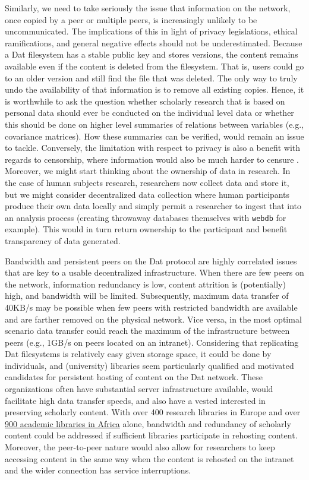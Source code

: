 \documentclass[publications,article,submit,moreauthors,pdftex,10pt,a4paper]{Definitions/mdpi}
\begin{document}
Similarly, we need to take seriously the issue that information on the
network, once copied by a peer or multiple peers, is increasingly
unlikely to be uncommunicated. The implications of this in light of
privacy legislations, ethical ramifications, and general negative
effects should not be underestimated. Because a Dat filesystem has a
stable public key and stores versions, the content remains available
even if the content is deleted from the filesystem. That is, users could
go to an older version and still find the file that was deleted. The
only way to truly undo the availability of that information is to remove
all existing copies. Hence, it is worthwhile to ask the question whether
scholarly research that is based on personal data should ever be
conducted on the individual level data or whether this should be done on
higher level summaries of relations between variables (e.g., covariance
matrices). How these summaries can be verified, would remain an issue to
tackle. Conversely, the limitation with respect to privacy is also a
benefit with regards to censorship, where information would also be much
harder to censure \citep[in stark contrast to publishers that might be
pressured by governments;][]{guardian-cup}. Moreover, we might start
thinking about the ownership of data in research. In the case of human
subjects research, researchers now collect data and store it, but we
might consider decentralized data collection where human participants
produce their own data locally and simply permit a researcher to ingest
that into an analysis process (creating throwaway databases themselves
with \texttt{webdb} for example). This would in turn return ownership to
the participant and benefit transparency of data generated.

Bandwidth and persistent peers on the Dat protocol are highly correlated
issues that are key to a usable decentralized infrastructure. When there
are few peers on the network, information redundancy is low, content
attrition is (potentially) high, and bandwidth will be limited.
Subsequently, maximum data transfer of 40KB/s may be possible when few
peers with restricted bandwidth are available and are farther removed on
the physical network. Vice versa, in the most optimal scenario data
transfer could reach the maximum of the infrastructure between peers
(e.g., 1GB/s on peers located on an intranet). Considering that
replicating Dat filesystems is relatively easy given storage space, it
could be done by individuals, and (university) libraries seem
particularly qualified and motivated candidates for persistent hosting
of content on the Dat network. These organizations often have
substantial server infrastructure available, would facilitate high data
transfer speeds, and also have a vested interested in preserving
scholarly content. With over 400 research libraries in Europe and over
\href{http://db.aflia.net/list/?q=6\&m=n}{900 academic libraries in
Africa} alone, bandwidth and redundancy of scholarly content could be
addressed if sufficient libraries participate in rehosting content.
Moreover, the peer-to-peer nature would also allow for researchers to
keep accessing content in the same way when the content is rehosted on
the intranet and the wider connection has service interruptions.
\end{document}
